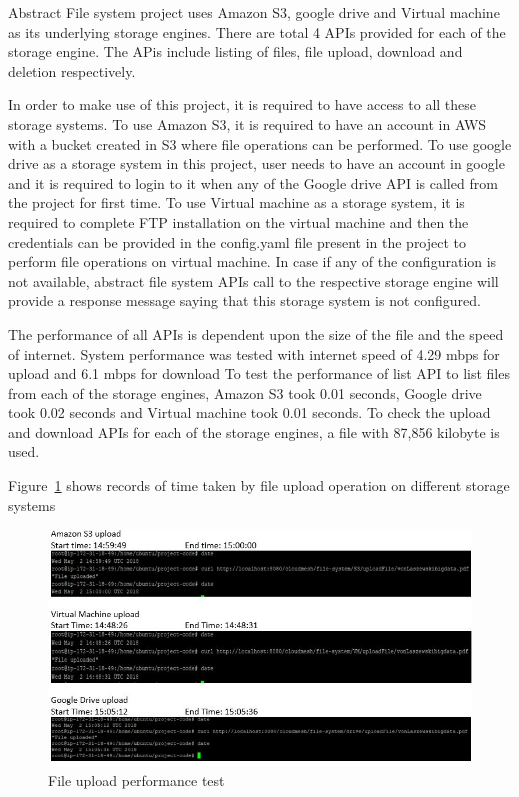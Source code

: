 Abstract File system project uses Amazon S3, google drive and Virtual
machine as its underlying storage engines. There are total 4 APIs
provided for each of the storage engine. The APis include listing of
files, file upload, download and deletion respectively.

In order to make use of this project, it is required to have access to
all these storage systems. To use Amazon S3, it is required to have an
account in AWS with a bucket created in S3 where file operations can
be performed. To use google drive as a storage system in this project,
user needs to have an account in google and it is required to login to
it when any of the Google drive API is called from the project for
first time. To use Virtual machine as a storage system, it is required
to complete FTP installation on the virtual machine and then the
credentials can be provided in the config.yaml file present in the
project to perform file operations on virtual machine.  In case if any
of the configuration is not available, abstract file system APIs call
to the respective storage engine will provide a response message
saying that this storage system is not configured.

The performance of all APIs is dependent upon the size of the file and
the speed of internet. System performance was tested with internet
speed of 4.29 mbps for upload and 6.1 mbps for download To test the
performance of list API to list files from each of the storage
engines, Amazon S3 took 0.01 seconds, Google drive took 0.02 seconds
and Virtual machine took 0.01 seconds.  To check the upload and
download APIs for each of the storage engines, a file with 87,856
kilobyte is used.

Figure~\ref{fig:upload-test} shows records of time taken 
by file upload operation on different storage systems

\begin{figure}[!ht]
        \centering\includegraphics[width=\columnwidth]
        {image/upload-test.JPG}
        \caption{File upload performance test}\label{fig:upload-test}
\end{figure}


